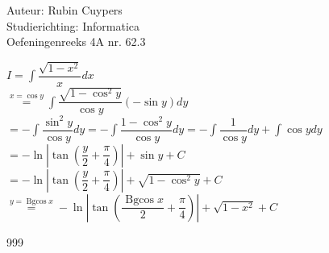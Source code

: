 \documentclass[a4paper]{article}
\newcommand{\dint}{\displaystyle \int}
\begin{document}
  
\noindent \large Auteur: Rubin Cuypers \\
\noindent \large Studierichting: Informatica\\
\noindent \large Oefeningenreeks 4A nr. 62.3\\

\medskip

\normalsize

$I=\dint \dfrac{\sqrt{1-x^2}}{x} dx$\\

$\overset{x=\cos y }{=} \dint \dfrac{\sqrt{1-\cos^2y}}{\cos y} (-\sin y) dy$ \\

$=-\dint \dfrac{\sin^2 y}{\cos y} dy =-\dint \dfrac{1-\cos^2y}{\cos y}dy = -\dint \dfrac{1}{\cos y} dy+ \dint \cos y dy$\\

$=-\ln \left| \tan\left( \dfrac{y}{2} + \dfrac{\pi}{4} \right) \right|+ \sin y +C$\\

$=-\ln \left| \tan\left( \dfrac{y}{2} + \dfrac{\pi}{4} \right) \right| +\sqrt{1-\cos^2y} + C$\\

$\overset{y=\operatorname{Bgcos} x}{=} -\ln \left| \tan\left( \dfrac{\operatorname{Bgcos} x}{2} + \dfrac{\pi}{4} \right) \right| +\sqrt{1-x^2} + C$\\

\begin{thebibliography}{999}
\end{thebibliography}
\end{document}

